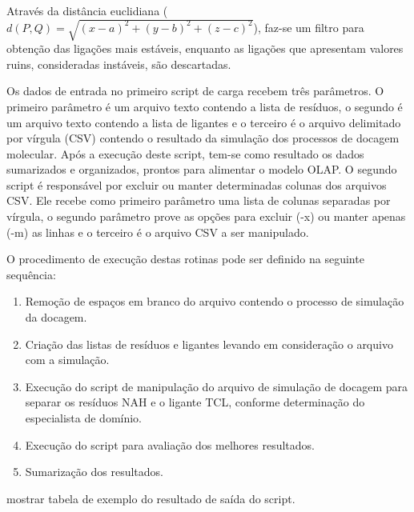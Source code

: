 Através da distância euclidiana ($d(P, Q)= \sqrt{(x - a)^{2} +(y - b)^{2} + (z - c)^{2}}$), faz-se um filtro para obtenção das ligações mais estáveis, enquanto as ligações que apresentam valores ruins, consideradas instáveis, são descartadas.

Os dados de entrada no primeiro script de carga recebem três parâmetros. O primeiro parâmetro é um arquivo texto contendo a lista de resíduos, o segundo é um arquivo texto contendo a lista de ligantes e o terceiro é o arquivo delimitado por vírgula (CSV) contendo o resultado da simulação dos processos de docagem molecular. Após a execução deste script, tem-se como resultado os dados sumarizados e organizados, prontos para alimentar o modelo OLAP. O segundo script é responsável por excluir ou manter determinadas colunas dos arquivos CSV. Ele recebe como primeiro parâmetro uma lista de colunas separadas por vírgula, o segundo parâmetro prove as opções para excluir (-x) ou manter apenas (-m) as linhas e o terceiro é o arquivo CSV a ser manipulado.

O procedimento de execução destas rotinas pode ser definido na seguinte sequência:

\begin{enumerate}
    \item Remoção de espaços em branco do arquivo contendo o processo de simulação da docagem. 
    \item Criação das listas de resíduos e ligantes levando em consideração o arquivo com a simulação.
    \item Execução do script de manipulação do arquivo de simulação de docagem para separar os resíduos NAH e o ligante TCL, conforme determinação do especialista de domínio.
    \item Execução do script para avaliação dos melhores resultados.
    \item Sumarização dos resultados.
\end{enumerate}

mostrar tabela de exemplo do resultado de saída do script.
